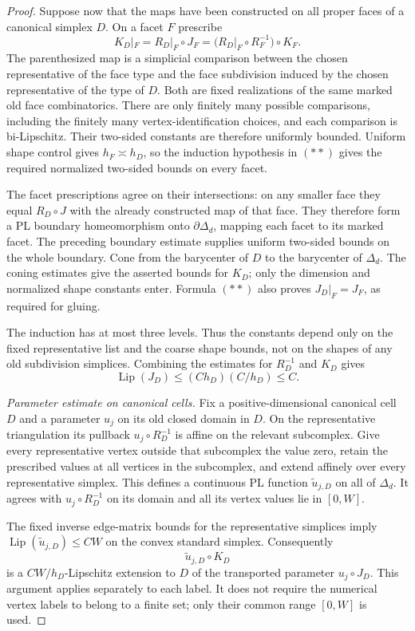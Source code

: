 \documentclass[11pt]{article}
\numberwithin{equation}{section}
\theoremstyle{definition}
\theoremstyle{remark}
\begin{document}
\begin{proof}
Suppose now that the maps have been constructed on all proper
faces of a canonical simplex $D$.  On a facet $F$ prescribe
\[
 K_D|_F
   =R_D|_F\circ J_F
   =\bigl(R_D|_F\circ R_F^{-1}\bigr)\circ K_F.       \tag{**}
\]
The parenthesized map is a simplicial comparison between the
chosen representative of the face type and the face subdivision
induced by the chosen representative of the type of $D$.
Both are fixed realizations of the same marked old face
combinatorics.  There are only finitely many possible comparisons,
including the finitely many vertex-identification choices, and
each comparison is bi-Lipschitz.  Their two-sided constants are
therefore uniformly bounded.  Uniform shape control gives
$h_F\asymp h_D$, so the induction hypothesis in $(**)$ gives the
required normalized two-sided bounds on every facet.

The facet prescriptions agree on their intersections: on any
smaller face they equal $R_D\circ J$ with the already constructed
map of that face.  They therefore form a PL boundary homeomorphism
onto $\partial\Delta_d$, mapping each facet to its marked facet.
The preceding boundary estimate supplies uniform two-sided bounds
on the whole boundary.  Cone from the barycenter of $D$ to the
barycenter of $\Delta_d$.  The coning estimates give the asserted
bounds for $K_D$; only the dimension and normalized shape constants
enter.  Formula $(**)$ also proves
$J_D|_F=J_F$, as required for gluing.

The induction has at most three levels.  Thus the constants depend
only on the fixed representative list and the coarse shape bounds,
not on the shapes of any old subdivision simplices.  Combining
the estimates for $R_D^{-1}$ and $K_D$ gives
\[
 \operatorname{Lip}(J_D)\leq (C h_D)(C/h_D)\leq C.
\]

\emph{Parameter estimate on canonical cells.}
Fix a positive-dimensional canonical cell $D$ and a parameter $u_j$
on its old closed domain in $D$.  On the
representative triangulation its pullback $u_j\circ R_D^{-1}$
is affine on the relevant subcomplex.  Give every representative
vertex outside that subcomplex the value zero, retain the
prescribed values at all vertices in the subcomplex, and extend
affinely over every representative simplex.  This defines a
continuous PL function $\widetilde u_{j,D}$ on all of $\Delta_d$.
It agrees with $u_j\circ R_D^{-1}$ on its domain and all its vertex
values lie in $[0,W]$.

The fixed inverse edge-matrix bounds for the representative
simplices imply
$\operatorname{Lip}(\widetilde u_{j,D})\leq C W$ on the convex standard simplex.
Consequently
\[
 \widetilde u_{j,D}\circ K_D
\]
is a $C W/h_D$-Lipschitz extension to $D$ of the transported
parameter $u_j\circ J_D$.  This argument applies separately to
each label.  It does not require the numerical vertex labels to
belong to a finite set; only their common range $[0,W]$ is used.


\end{proof}
\end{document}
